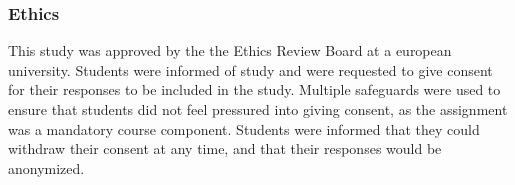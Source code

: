 \subsubsection{Ethics}
\label{ssec:ethics}
This study was approved by the the Ethics Review Board at a european university\anonfoot. Students were informed of study and were requested to give consent for their responses to be included in the study. Multiple safeguards were used to ensure that students did not feel pressured into giving consent, as the assignment was a mandatory course component. Students were informed that they could withdraw their consent at any time, and that their responses would be anonymized. 






